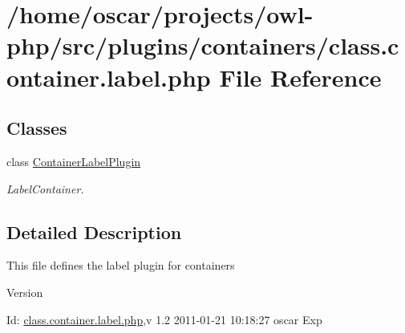 \section{/home/oscar/projects/owl-\/php/src/plugins/containers/class.container.label.php File Reference}
\label{class_8container_8label_8php}
\subsection*{Classes}
\begin{DoxyCompactItemize}
\item 
class \hyperlink{classContainerLabelPlugin}{ContainerLabelPlugin}
\begin{DoxyCompactList}\small\item\em LabelContainer. \item\end{DoxyCompactList}\end{DoxyCompactItemize}


\subsection{Detailed Description}
This file defines the label plugin for containers \begin{DoxyVersion}{Version}

\end{DoxyVersion}
\begin{DoxyParagraph}{Id:}
\hyperlink{class_8container_8label_8php}{class.container.label.php},v 1.2 2011-\/01-\/21 10:18:27 oscar Exp 
\end{DoxyParagraph}

